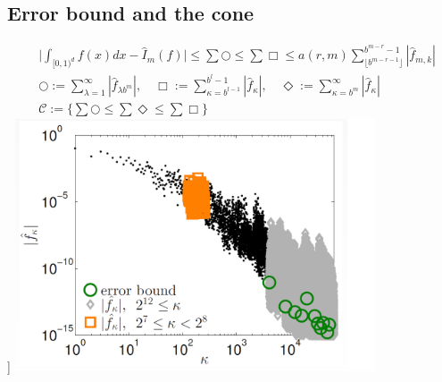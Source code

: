 \subsection{Error bound and the cone}
\begin{align*}
	&\Big|\int_{[0,1)^d}f(x)dx - \hat{I}_m(f)\Big|
    \leq \sum {\bigcirc} 
	\leq \sum {\Box}
	\leq a(r,m) \sum_{\lfloor b^{m-r-1} \rfloor}^{b^{m-r}-1}|\hat{f}_{m,k}|\\
    &\bigcirc:= \sum_{\lambda=1}^{\infty}| \hat{f}_{\lambda b^m}|,\quad  
    \Box:= \sum_{\kappa=b^{l-1}}^{b^l-1}|\hat{f}_\kappa|,\quad
    \Diamond:=\sum_{\kappa=b^m}^{\infty}|\hat{f}_{\kappa}|\\
    &\mathcal{C}:=\Big\{\sum{\bigcirc} \leq \sum{\Diamond} \leq \sum{\Box}\Big\}
\end{align*}
]
\includegraphics[width=0.8\textwidth]{figures/cone.bmp}
